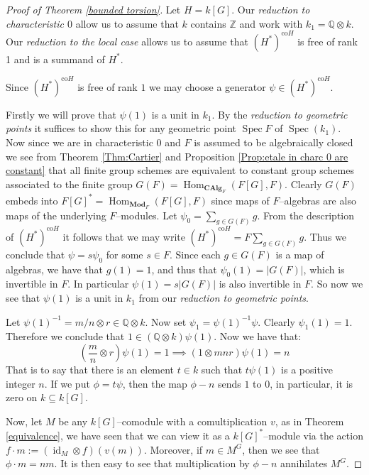 \documentclass{article}
\theoremstyle{plain}
\theoremstyle{definition}
\DeclareMathOperator{\id}{id}
\DeclareMathOperator{\Hom}{Hom}
\DeclareMathOperator{\Spec}{Spec}
\begin{document}
\begin{proof}[Proof of Theorem \ref{bounded torsion}]
    Let $H=k[G]$. Our \textit{reduction to characteristic $0$} allow us to assume that $k$ contains $\mathbb{Z}$ and work with $k_1=\mathbb{Q}\otimes k$. Our \textit{reduction to the local case} allows us to assume that $(H^*)^{\text{co}H}$ is free of rank 1 and is a summand of $H^*$. 
    
    Since $(H^*)^{\text{co}H}$ is free of rank $1$ we may choose a generator $\psi \in (H^*)^{\text{co}H}$.
    
    
    Firstly we will prove that $\psi(1)$ is a unit in $k_1$. By the \textit{reduction to geometric points} it suffices to show this for any geometric point $\Spec F$ of $\Spec (k_1)$. Now since we are in characteristic $0$ and $F$ is assumed to be algebraically closed we see from Theorem \ref{Thm:Cartier} and Proposition \ref{Prop:etale in charc 0 are constant} that all finite group schemes are equivalent to constant group schemes associated to the finite group $G(F)=\Hom_{\textbf{CAlg}_F}(F[G], F)$. Clearly $G(F)$ embeds into $F[G]^*=\Hom_{\textbf{Mod}_F}(F[G], F)$ since maps of $F$--algebras are also maps of the underlying $F$--modules. Let $\psi_0=\sum_{g\in G(F)} g$. From the description of $(H^*)^{\text{co}H}$ it follows that we may write $(H^*)^{\text{co}H}=F\sum_{g\in G(F)} g$.  Thus we conclude that $\psi=s\psi_0$ for some $s\in F$. Since each $g\in G(F)$ is a map of algebras, we have that $g(1)=1$, and thus that $\psi_0(1)=|G(F)|$, which is invertible in $F$. In particular $\psi(1)=s|G(F)|$ is also invertible in $F$. So now we see that $\psi(1)$ is a unit in $k_1$ from our \textit{reduction to geometric points}.

     Let $\psi(1)^{-1}=m/n \otimes r \in \mathbb{Q}\otimes k$. Now set $\psi_1=\psi(1)^{-1}\psi$. Clearly $\psi_1(1)=1$. Therefore we conclude that $1\in (\mathbb{Q}\otimes k)\psi(1)$. Now we have that:
    \[
    \left(\frac{m}{n}\otimes r\right)\psi(1)=1 \implies (1\otimes mnr)\psi(1)=n
    \]
    That is to say that there is an element $t\in k$ such that $t\psi(1)$ is a positive integer $n$. If we put $\phi=t\psi$, then the map $\phi-n$ sends $1$ to $0$, in particular, it is zero on $k \subseteq k[G]$.

    Now, let $M$ be any $k[G]$--comodule with a comultiplication $v$, as in Theorem \ref{equivalence}, we have seen that we can view it as a $k[G]^*$--module via the action $f\cdot m := (\id_M\otimes f)(v(m))$. Moreover, if $m\in M^G$, then we see that $\phi \cdot m=nm$. It is then easy to see that multiplication by $\phi-n$ annihilates $M^G$.


\end{proof}
\end{document}

